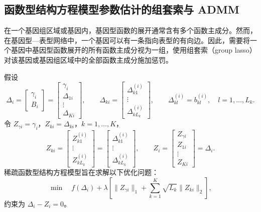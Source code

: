 \subsection{函数型结构方程模型参数估计的组套索与 ADMM}

在一个基因组区域或基因内，基因型函数的展开通常含有多个函数主成分。然而，在基因型—表型网络中，一个基因可以有一条指向表型的有向边。因此，需要将一个基因中基因型函数展开的所有函数主成分视为一组，使用组套索（group lasso）对该基因或基因组区域中的全部函数主成分施加惩罚。

假设
\[
\Delta_i=
\begin{bmatrix}\gamma_i\\B_i\end{bmatrix}
=\begin{bmatrix}\gamma_i\\\Delta_{1i}\\\vdots\\\Delta_{Ki}\end{bmatrix},
\qquad
\Delta_{ki}=\begin{bmatrix}\Delta_{k1}^{(i)}\\\vdots\\\Delta_{kL_k}^{(i)}\end{bmatrix},
\qquad
\Delta_{kl}^{(i)}=b_{kl}^{(i)},\quad l=1,\ldots,L_k.
\]
令 $Z_{\gamma i}=\gamma_i$，$Z_{ki}=\Delta_{ki}$，$k=1,\ldots,K$，
\[
Z_{ki}
=\begin{bmatrix}Z_{k1}^{(i)}\\\vdots\\Z_{kL_k}^{(i)}\end{bmatrix}
=\begin{bmatrix}\Delta_{k1}^{(i)}\\\vdots\\\Delta_{kL_k}^{(i)}\end{bmatrix},
\qquad
Z_i=\begin{bmatrix}Z_{\gamma i}\\Z_{1i}\\\vdots\\Z_{Ki}\end{bmatrix}
=\Delta_i.
\]
稀疏函数型结构方程模型旨在求解以下优化问题：
\begin{equation}
\min\quad f(\Delta_i)+
\lambda\left[\|Z_{\gamma i}\|_1+
\sum_{k=1}^K\sqrt{L_k}\|Z_{ki}\|_2\right],
\tag{1.110}
\end{equation}
约束为 $\Delta_i-Z_i=0$。

